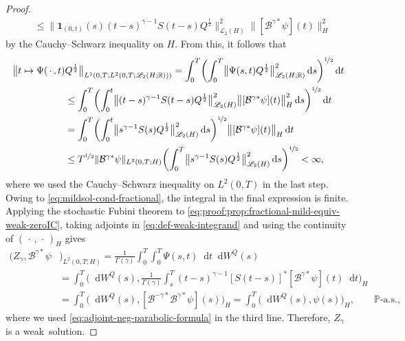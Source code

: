 \documentclass[reqno]{amsart}
\numberwithin{equation}{section}
\newcommand{\bbP}{\mathbb{P}}
\newcommand{\R}{\mathbb{R}}
\newcommand{\cB}{\mathcal{B}}
\newcommand{\norm}[2]{     \| #1       \|_{ #2 }}
\newcommand{\rd}{\mathop{}\!\mathrm{d}}
\theoremstyle{remark}
\theoremstyle{definition}
\begin{document}
\begin{proof}
\begin{align*}
	&\leq 
	\bigl\| \mathbf 1_{(0,t)}(s) (t-s)^{\gamma-1} S(t-s) Q^\frac{1}{2} 
	\bigr\|_{\mathscr L_2(H)}^2 
	\bigl\| [\cB^{\gamma*}\psi](t) \bigr\|_{H}^2 
	\end{align*}
	by the Cauchy--Schwarz inequality  
	on $H$. 
	From this, it follows that
	\begin{align*}
	\bigl\| 
	t\mapsto \Psi(\,\cdot\,,t) &Q^{\frac{1}{2}} \bigr\|_{
		L^1(0,T;L^2(0,T;\mathscr{L}_2(H;\R)))} 
	= 
	\int_0^T 
	\biggl( \int_0^T 
	\bigl\| \Psi(s,t) Q^{\frac{1}{2}} \bigr\|_{\mathscr L_2(H;\R)}^2 
	\rd s \biggr)^{\nicefrac{1}{2}}
	\rd t 
	\\
	&\leq 
	\int_0^T 
	\biggl( \int_0^t 
	\bigl\| (t-s)^{\gamma-1}S(t-s) Q^{\frac{1}{2}} \bigr\|_{\mathscr L_2(H)}^2
	\bigl\| [\cB^{\gamma*}\psi](t) \bigr\|_{H}^2 \rd s 
	\biggr)^{\nicefrac{1}{2}} 
	\rd t 
	\\
	&= 
	\int_0^T 
	\biggl(\int_0^t 
	\bigl\| s^{\gamma-1}S(s)Q^\frac{1}{2} \bigr\|_{\mathscr L_2(H)}^2  
	\rd s\biggr)^{\nicefrac{1}{2}} 
	\bigl\| [\cB^{\gamma*}\psi](t) \bigr\|_{H} \rd t 
	\\
	&\leq 
	T^{\nicefrac{1}{2}} 
	\norm{ \cB^{\gamma*}\psi }{L^2(0,T;H)}
	\biggl( 
	\int_0^T 
	\bigl\| s^{\gamma-1} S(s) Q^{\frac{1}{2}} \bigr\|_{\mathscr L_2(H)}^2  
	\rd s \biggr)^{ \nicefrac{1}{2} }  
	< \infty, 
	\end{align*}
	where we used the Cauchy--Schwarz inequality on $L^2(0,T)$ 
	in the last step. 
	Owing to \eqref{eq:mildsol-cond-fractional}, 
	the integral in the final expression is finite. 
	Applying the stochastic Fubini theorem 
	to \eqref{eq:proof:prop:fractional-mild-equiv-weak-zeroIC}, 
	taking adjoints in \eqref{eq:def-weak-integrand} 
	and using the continuity of $(\,\cdot\,,\,\cdot\,)_H$ 
	gives  
	\begin{align*}
	(Z_\gamma, \cB^{\gamma*}\psi &)_{L^2(0,T;H)} 
	= 
	\frac{1}{\Gamma(\gamma)}
	\int_0^T\int_0^T \Psi(s,t) \rd t\rd W^Q(s)
	\\
	&= 
	\int_0^T 
	\biggl( \rd W^Q(s), 
	\frac{1}{\Gamma(\gamma)}
	\int_s^T (t-s)^{\gamma-1}[S(t-s)]^*[\cB^{\gamma*}\psi](t) 
	\rd t\biggr)_H 
	\\
	&= 
	\int_0^T  
	\bigl( 
	\rd W^Q(s), 
	[\cB^{-\gamma*}\cB^{\gamma*}\psi](s) 
	\bigr)_H 
	= 
	\int_0^T \bigl( \rd W^Q(s), \psi(s) \bigr)_H, 
	\qquad 
	\bbP\text{-a.s.}, 
	\end{align*}
	where we used \eqref{eq:adjoint-neg-parabolic-formula} 
	in the third line. 
	Therefore, $Z_\gamma$ is a weak~solution.
	

\end{proof}
\end{document}
